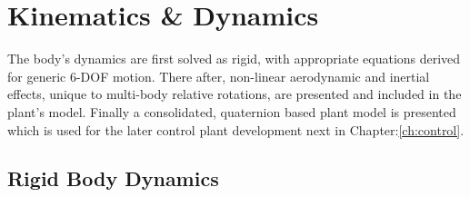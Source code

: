 \chapter{Kinematics \& Dynamics}
\label{ch:dynamics}
The body's dynamics are first solved as rigid, with appropriate equations derived for generic 6-DOF motion. There after, non-linear aerodynamic and inertial effects, unique to multi-body relative rotations, are presented and included in the plant's model. Finally a consolidated, quaternion based plant model is presented which is used for the later control plant development next in Chapter:\ref{ch:control}.
\section{Rigid Body Dynamics}
\label{sec:dynamics.rigidbody}
